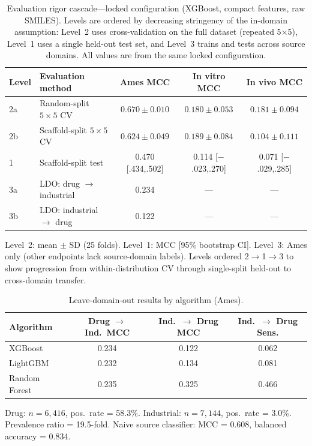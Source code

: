 \begin{table}[ht]
\caption{Evaluation rigor cascade---locked configuration (XGBoost, compact features, raw SMILES). Levels are ordered by decreasing stringency of the in-domain assumption: Level~2 uses cross-validation on the full dataset (repeated 5$\times$5), Level~1 uses a single held-out test set, and Level~3 trains and tests across source domains. All values are from the same locked configuration.}
\label{tab:cascade}
\centering
\small
\begin{tabular}{@{}llccc@{}}
\toprule
Level & Evaluation method & Ames MCC & In vitro MCC & In vivo MCC \\
\midrule
2a & Random-split $5\!\times\!5$ CV & $0.670 \pm 0.010$ & $0.180 \pm 0.053$ & $0.181 \pm 0.094$ \\
2b & Scaffold-split $5\!\times\!5$ CV & $0.624 \pm 0.049$ & $0.189 \pm 0.084$ & $0.104 \pm 0.111$ \\
1 & Scaffold-split test & 0.470 [.434,.502] & 0.114 [$-$.023,.270] & 0.071 [$-$.029,.285] \\
3a & LDO: drug $\to$ industrial & 0.234 & --- & --- \\
3b & LDO: industrial $\to$ drug & 0.122 & --- & --- \\
\bottomrule
\end{tabular}

\medskip
\footnotesize
Level~2: mean $\pm$ SD (25 folds). Level~1: MCC [95\% bootstrap CI]. Level~3: Ames only (other endpoints lack source-domain labels). Levels ordered 2$\to$1$\to$3 to show progression from within-distribution CV through single-split held-out to cross-domain transfer.
\end{table}


\begin{table}[ht]
\caption{Leave-domain-out results by algorithm (Ames).}
\label{tab:ldo}
\centering
\small
\begin{tabular}{@{}lccc@{}}
\toprule
Algorithm & Drug $\to$ Ind.\ MCC & Ind.\ $\to$ Drug MCC & Ind.\ $\to$ Drug Sens. \\
\midrule
XGBoost & 0.234 & 0.122 & 0.062 \\
LightGBM & 0.232 & 0.134 & 0.081 \\
Random Forest & 0.235 & 0.325 & 0.466 \\
\bottomrule
\end{tabular}

\medskip
\footnotesize
Drug: $n = 6{,}416$, pos.\ rate = 58.3\%. Industrial: $n = 7{,}144$, pos.\ rate = 3.0\%. Prevalence ratio = 19.5-fold. Naive source classifier: MCC = 0.608, balanced accuracy = 0.834.
\end{table}


